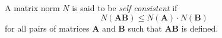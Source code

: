 \documentclass[12pt]{article}
\newcommand{\mv}[1]{\mathbf{#1}}
\begin{document}
A matrix norm $N$ is said to be \emph{self consistent} if
\begin{displaymath}
N(\mv{A}\mv{B})\leq N(\mv{A})\cdot N(\mv{B})
\end{displaymath}
for all pairs of matrices $\mv{A}$ and $\mv{B}$ such that $\mv{A}\mv{B}$ is defined.
\end{document}
